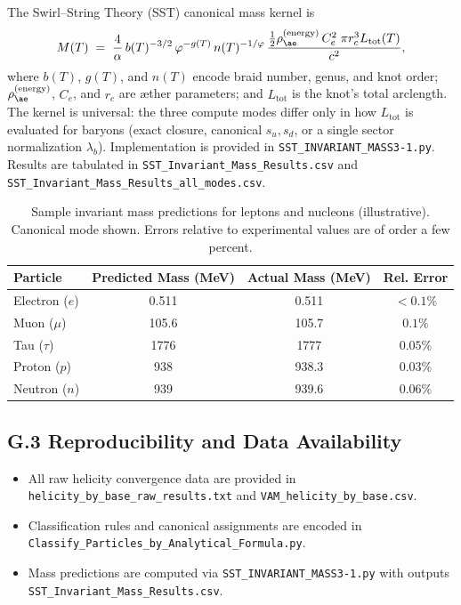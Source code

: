\documentclass[11pt, preprint,titlepage]{revtex4-2}
\begin{document}
    The Swirl–String Theory (SST) canonical mass kernel is
    \[
        M(T) \;=\;
        \frac{4}{\alpha}\, b(T)^{-3/2}\, \varphi^{-g(T)}\, n(T)^{-1/\varphi}
        \,
        \frac{\tfrac12 \rho_{\ae}^{(\text{energy})}\,C_e^2 \;\pi r_c^3 L_{\text{tot}}(T)}{c^2},
    \]
    where $b(T)$, $g(T)$, and $n(T)$ encode braid number, genus, and knot order; $\rho_{\ae}^{(\text{energy})}$, $C_e$, and $r_c$ are æther parameters; and $L_{\text{tot}}$ is the knot’s total arclength.
    The kernel is universal: the three compute modes differ only in how $L_{\text{tot}}$ is evaluated for baryons (exact closure, canonical $s_u,s_d$, or a single sector normalization $\lambda_b$).
    Implementation is provided in {\tt SST\_INVARIANT\_MASS3-1.py}.
    Results are tabulated in {\tt SST\_Invariant\_Mass\_Results.csv} and {\tt SST\_Invariant\_Mass\_Results\_all\_modes.csv}.

    \begin{table}[h!]
    \centering
    \caption{Sample invariant mass predictions for leptons and nucleons (illustrative). Canonical mode shown. Errors relative to experimental values are of order a few percent.}
    \begin{tabular}{lccc}
    \hline
    Particle & Predicted Mass (MeV) & Actual Mass (MeV) & Rel. Error \\
    \hline
    Electron ($e$) & 0.511 & 0.511 & $<0.1\%$ \\
    Muon ($\mu$)   & 105.6 & 105.7 & $0.1\%$ \\
    Tau ($\tau$)   & 1776  & 1777  & $0.05\%$ \\
    Proton ($p$)   & 938   & 938.3 & $0.03\%$ \\
    Neutron ($n$)  & 939   & 939.6 & $0.06\%$ \\
    \hline
    \end{tabular}
    \end{table}

\subsection*{G.3 Reproducibility and Data Availability}

    \begin{itemize}
    \item All raw helicity convergence data are provided in {\tt helicity\_by\_base\_raw\_results.txt} and {\tt VAM\_helicity\_by\_base.csv}.
    \item Classification rules and canonical assignments are encoded in {\tt Classify\_Particles\_by\_Analytical\_Formula.py}.
    \item Mass predictions are computed via {\tt SST\_INVARIANT\_MASS3-1.py} with outputs {\tt SST\_Invariant\_Mass\_Results.csv}.
    \end{itemize}
\end{document}
